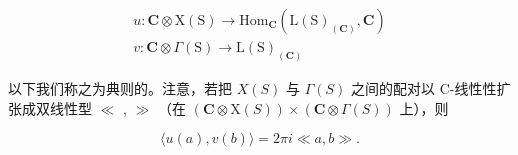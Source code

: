 \[
\begin{array}{l} u: \mathbf {C} \otimes \mathrm{X} (\mathrm{S}) \to \mathrm{Hom} _ {\mathbf {C}} (\mathrm{L} (\mathrm{S}) _ {(\mathbf {C})}, \mathbf {C}) \\ v: \mathbf {C} \otimes \Gamma (\mathrm{S}) \to \mathrm{L} (\mathrm{S}) _ {(\mathbf {C})} \end{array}
\]

以下我们称之为典则的。注意，若把 \(X(S)\) 与 \(\Gamma(S)\) 之间的配对以 C-线性性扩张成双线性型 \(\ll\) , \(\gg\) （在 \((\mathbf{C} \otimes \mathrm{X}(S)) \times (\mathbf{C} \otimes \Gamma(S))\) 上），则

\[
\langle u (a), v (b) \rangle = 2 \pi i \ll a, b \gg .
\]

